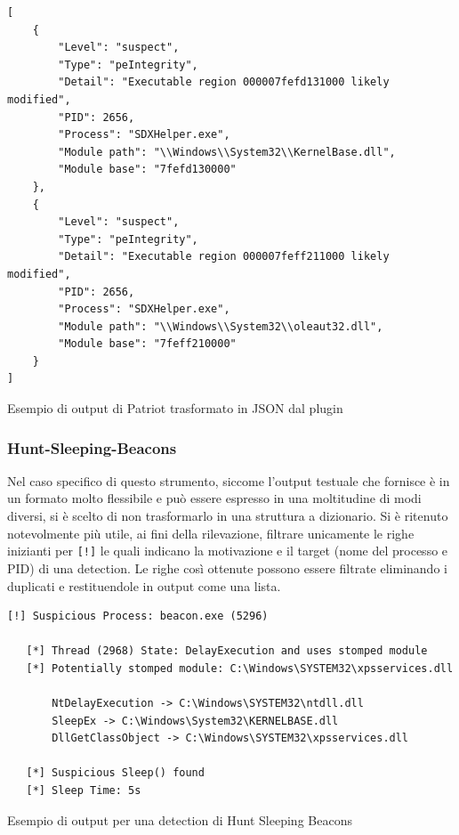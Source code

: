 \begin{code}
\begin{verbatim}
[
    {
        "Level": "suspect",
        "Type": "peIntegrity",
        "Detail": "Executable region 000007fefd131000 likely modified",
        "PID": 2656,
        "Process": "SDXHelper.exe",
        "Module path": "\\Windows\\System32\\KernelBase.dll",
        "Module base": "7fefd130000"
    },
    {
        "Level": "suspect",
        "Type": "peIntegrity",
        "Detail": "Executable region 000007feff211000 likely modified",
        "PID": 2656,
        "Process": "SDXHelper.exe",
        "Module path": "\\Windows\\System32\\oleaut32.dll",
        "Module base": "7feff210000"
    }
]
\end{verbatim}
\caption{Esempio di output di Patriot trasformato in JSON dal plugin}
\end{code}

\subsubsection{Hunt-Sleeping-Beacons}
Nel caso specifico di questo strumento, siccome l'output testuale che fornisce è in un formato molto flessibile e può essere espresso in una moltitudine di modi diversi, si è scelto di non trasformarlo in una struttura a dizionario.
Si è ritenuto notevolmente più utile, ai fini della rilevazione, filtrare unicamente le righe inizianti per \texttt{[!]} le quali indicano la motivazione e il target (nome del processo e PID) di una detection.
Le righe così ottenute possono essere filtrate eliminando i duplicati e restituendole in output come una lista.

\begin{code}
\begin{verbatim}
[!] Suspicious Process: beacon.exe (5296)

   [*] Thread (2968) State: DelayExecution and uses stomped module
   [*] Potentially stomped module: C:\Windows\SYSTEM32\xpsservices.dll

       NtDelayExecution -> C:\Windows\SYSTEM32\ntdll.dll
       SleepEx -> C:\Windows\System32\KERNELBASE.dll
       DllGetClassObject -> C:\Windows\SYSTEM32\xpsservices.dll

   [*] Suspicious Sleep() found
   [*] Sleep Time: 5s
\end{verbatim}
\label{lst:hunt-sleeping-beacons-example-text}
\caption{Esempio di output per una detection di Hunt Sleeping Beacons}
\end{code}

